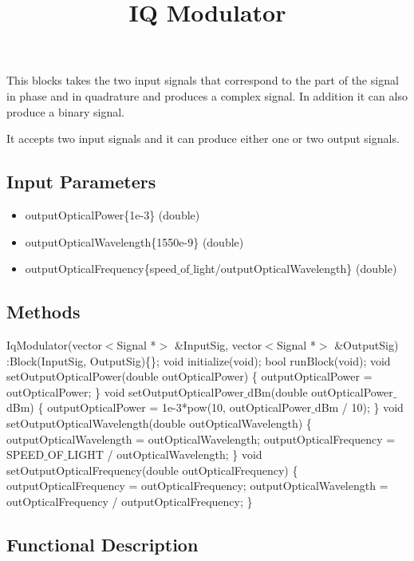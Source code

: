 \documentclass[a4paper]{article}
\title{IQ Modulator}
\begin{document}
\maketitle

This blocks takes the two input signals that correspond to the part of the signal in phase and in quadrature and produces a complex signal. In addition it can also produce a binary signal.

It accepts two input signals and it can produce either one or two output signals.

\subsection*{Input Parameters}

\begin{itemize}
	\item outputOpticalPower\{1e-3\} \linebreak
	(double)
	\item outputOpticalWavelength\{1550e-9\} \linebreak (double)
	\item outputOpticalFrequency\{speed$\_$of$\_$light/outputOpticalWavelength\} \linebreak
	(double)
\end{itemize}

\subsection*{Methods}

IqModulator(vector$<$Signal *$>$ \&InputSig, vector$<$Signal *$>$ \&OutputSig) :Block(InputSig, OutputSig)\{\};
\bigbreak
void initialize(void);
\bigbreak
bool runBlock(void);
\bigbreak
void setOutputOpticalPower(double outOpticalPower) \{ outputOpticalPower = outOpticalPower; \}
\bigbreak
void setOutputOpticalPower$\_$dBm(double outOpticalPower$\_$dBm) \{ outputOpticalPower = 1e-3*pow(10, outOpticalPower$\_$dBm / 10); \}
\bigbreak
void setOutputOpticalWavelength(double outOpticalWavelength) \{ outputOpticalWavelength = outOpticalWavelength; outputOpticalFrequency = SPEED$\_$OF$\_$LIGHT / outOpticalWavelength; \}
\bigbreak
void setOutputOpticalFrequency(double outOpticalFrequency) \{ outputOpticalFrequency = outOpticalFrequency; outputOpticalWavelength = outOpticalFrequency / outputOpticalFrequency; \}

\subsection*{Functional Description}
\end{document}

